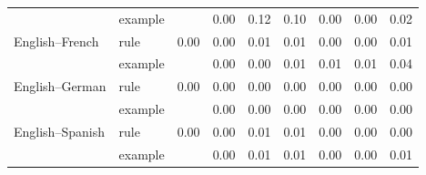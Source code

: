 \begin{tabular}{@{}llccccccc@{}}
 & example &  & 0.00 & 0.12 & 0.10 & 0.00 & 0.00 & 0.02 \\
English--French & rule & 0.00 & 0.00 & 0.01 & 0.01 & 0.00 & 0.00 & 0.01 \\
 & example &  & 0.00 & 0.00 & 0.01 & 0.01 & 0.01 & 0.04 \\
English--German & rule & 0.00 & 0.00 & 0.00 & 0.00 & 0.00 & 0.00 & 0.00 \\
 & example &  & 0.00 & 0.00 & 0.00 & 0.00 & 0.00 & 0.00 \\
English--Spanish & rule & 0.00 & 0.00 & 0.01 & 0.01 & 0.00 & 0.00 & 0.00 \\
 & example &  & 0.00 & 0.01 & 0.01 & 0.00 & 0.00 & 0.01 \\
\bottomrule
\end{tabular}
